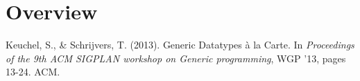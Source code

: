 {%

} %

\section{Overview}

\begin{center}
  \begin{minipage}{0.8\columnwidth}
    Keuchel, S., \& Schrijvers, T. (2013).
    \newblock Generic Datatypes à la Carte.
    \newblock In {\em Proceedings of the 9th ACM SIGPLAN workshop on Generic
      programming}, WGP ’13, pages 13-24. ACM.
  \end{minipage}
\end{center}

